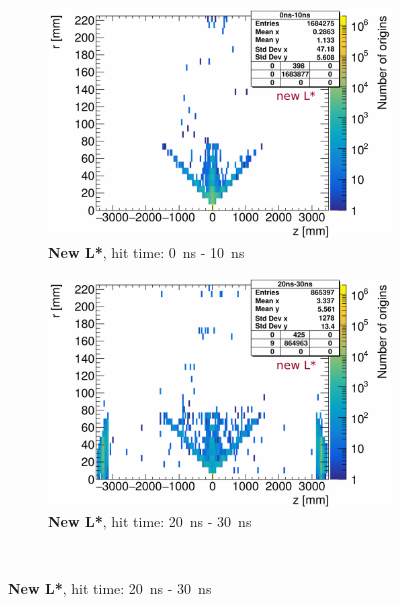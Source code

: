  \begin{figure}
 \centering
  \begin{subfigure}[b]{0.49\textwidth}
   \centering
    \includegraphics[width=\textwidth]{Figures/Pairs/hitmaps_particleorigins_hittime_0ns-10ns_SiVertexBarrelSiVertexEndcap_newLStar.pdf}
   \caption{\textbf{New L*}, hit time: \SI[detect-all]{0}{\nano\second} - \SI[detect-all]{10}{\nano\second}}
   \end{subfigure}
   \hfill
    \begin{subfigure}[b]{0.49\textwidth}
   \centering
    \includegraphics[width=\textwidth]{Figures/Pairs/hitmaps_particleorigins_hittime_20ns-30ns_SiVertexBarrelSiVertexEndcap_newLStar.pdf}
   \caption{\textbf{New L*}, hit time: \SI[detect-all]{20}{\nano\second} - \SI[detect-all]{30}{\nano\second}}
   \end{subfigure}\\

\end{figure}
